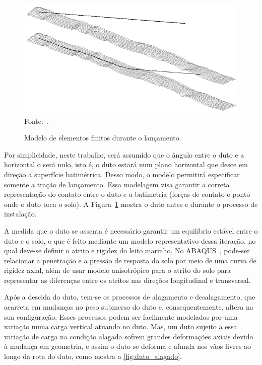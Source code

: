\begin{figure}[!ht]
    \centering
    \caption{Modelo de elementos finitos durante o lançamento.}\label{fig:lancamentododuto}
    \includegraphics[width=0.7\linewidth]{imagens/lancamento_do_duto}
    \\Fonte:~.
\end{figure}

Por simplicidade, neste trabalho, será assumido que o ângulo entre o duto e a horizontal o será nulo, isto é, o duto estará num plano horizontal que desce em direção a superfície batimétrica.
Desso modo, o modelo permitirá especificar somente a tração de lançamento.
Essa modelagem visa garantir a correta representação do contato entre o duto e a batimetria (forças de contato e ponto onde o duto toca o solo).
A Figura~\ref{fig:lancamentododuto} mostra o duto antes e durante o processo de instalação.

A medida que o duto se assenta é necessário garantir um equilíbrio estável entre o duto e o solo, o que é feito mediante um modelo representativo dessa iteração, no qual deve-se definir o atrito e rigidez do leito marinho.
No ABAQUS~\cite{Dassault2018}, pode-ser relacionar a penetração e a pressão de resposta do solo por meio de uma curva de rigidez axial, além de usar modelo anisotrópico para o atrito do solo para representar as diferenças entre os atritos nas direções longitudinal e transversal.

Após a descida do duto, tem-se os processos de alagamento e desalagamento, que acarreta em mudanças no peso submerso do duto e, consequentemente, altera na sua configuração.
Esses processos podem ser facilmente modelados por uma variação numa carga vertical atuando no duto.
Mas, um duto sujeito a essa variação de carga na condição alagada sofrem grandes deformações axiais devido à mudança em geometria, e assim o duto se deforma e afunda nos vãos livres ao longo da rota do duto, como mostra a \autoref{fig:duto_alagado}.


